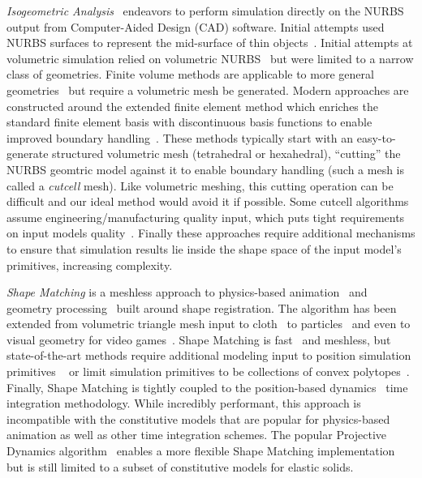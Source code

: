 \emph{Isogeometric Analysis}~\cite{10.1002/9780470749081.ch7} endeavors to perform simulation directly on the NURBS output from 
Computer-Aided Design (CAD) software. Initial attempts used NURBS surfaces to represent the mid-surface of thin objects~\cite{10.1145/176579.176580}.
Initial attempts at volumetric simulation relied on volumetric NURBS~\cite{10.1007/978-3-642-03596-8_2} but were limited to a narrow class of geometries.
Finite volume methods are applicable to more general geometries~\cite{HEINRICH20121645,10.1002/nme.2311} but require a volumetric mesh be generated.
Modern approaches are constructed around the extended finite element method which enriches the standard finite element basis with discontinuous basis functions
to enable improved boundary handling~\cite{https://doi.org/10.1002/nme.3120,10.1007/s00466-013-0854-7,https://doi.org/10.1002/nme.4852,SAFDARI2016373,10.1145/3355089.3356576}. 
These methods typically start with an easy-to-generate structured volumetric mesh (tetrahedral or hexahedral), ``cutting'' the NURBS geomtric model against
it to enable boundary handling (such a mesh is called a \emph{cutcell} mesh). 
Like volumetric meshing, this cutting operation can be difficult and our ideal method would avoid it if possible. 
Some cutcell algorithms assume engineering/manufacturing quality input, which puts tight requirements on input models quality~\cite{10.1145/3355089.3356576}.
Finally these approaches require additional mechanisms to ensure that simulation results lie inside the shape space of the input model's primitives,
increasing complexity. 

\emph{Shape Matching} is a meshless approach to physics-based animation~\cite{10.1145/1073204.1073216,10.1145/2019406.2019438} and geometry processing~\cite{10.1111/j.1467-8659.2012.03171.x}
built around shape registration. The algorithm has been extended from volumetric triangle mesh input to cloth~\cite{10.2312/PE/vriphys/vriphys08/039-046} to particles~\cite{10.1145/1964921.1964987}
and even to visual geometry for video games~\cite{10.1145/2994258.2994260}. 
Shape Matching is fast~\cite{10.1145/1275808.1276480,10.5555/1632592.1632606} and meshless, but state-of-the-art methods require 
additional modeling input to position simulation primitives ~\cite{0.1145/1964921.1964987} or limit simulation primitives to be 
collections of convex polytopes~\cite{10.1145/2994258.2994260}.
Finally, Shape Matching is tightly coupled to the position-based dynamics~\cite{muller2007position}
time integration methodology. 
While incredibly performant, this approach is incompatible with the constitutive models that are popular for physics-based animation as well as 
other time integration schemes. 
The popular Projective Dynamics algorithm~\cite{10.1145/2601097.2601116} enables a more flexible Shape Matching implementation but is still limited to a subset of
constitutive models for elastic solids. 

